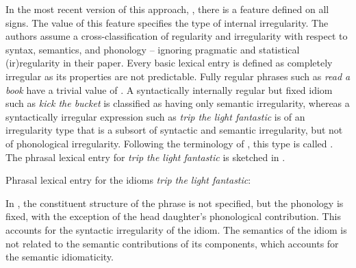 \documentclass[output=paper]{langsci/langscibook}
\begin{document}
In the most recent version of this approach, \cite{Richter:Sailer:09}, there is a feature  defined on all signs. 
The value of this feature specifies the type of internal irregularity. 
The authors assume a cross-classification of regularity and irregularity with respect to syntax, semantics, and phonology -- ignoring pragmatic and statistical (ir)regularity in their paper. 
Every basic lexical entry is defined as completely irregular as its properties are not predictable. 
Fully regular phrases such as \emph{read a book} have a trivial value of . 
A syntactically internally regular but fixed idiom such as \emph{kick the bucket} is classified as having only semantic irregularity, whereas a syntactically irregular expression such as \emph{trip the light fantastic} is of an irregularity type that is a subsort of syntactic and semantic irregularity, but not of phonological irregularity.
Following the terminology of \cite{FKoC88a}, this type is called .
%
The phrasal lexical entry for \emph{trip the light fantastic} is sketched in  .

\ea Phrasal lexical entry for the idioms \emph{trip the light fantastic}:\label{rs-trip}\\
\z 

In , the constituent structure of the phrase is not specified, but the phonology is fixed, with the exception of the head daughter's phonological contribution. This accounts for the syntactic irregularity of the idiom. The semantics of the idiom is not related to the semantic contributions of its components, which accounts for the semantic idiomaticity.
\end{document}
